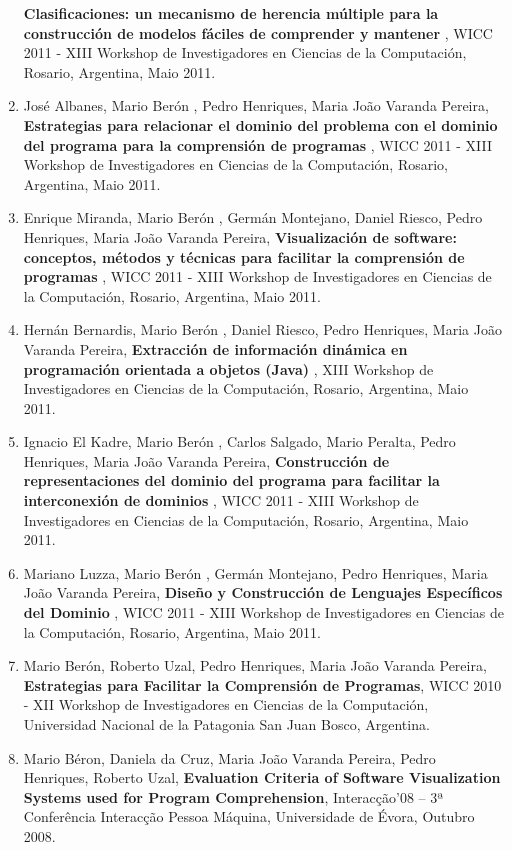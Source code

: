 \documentclass[11pt]{article}
\begin{document}
\begin{enumerate}
{{\bf{ Clasificaciones: un mecanismo de herencia múltiple para la construcción de modelos fáciles de comprender y mantener}} , WICC 2011 - XIII Workshop de Investigadores en Ciencias de la Computación, Rosario, Argentina, Maio 2011. }
\item{José Albanes,  Mario Berón , Pedro Henriques, Maria João Varanda Pereira, {
\bf{ Estrategias para relacionar el dominio del problema con el dominio del programa para la comprensión de programas}} , WICC 2011 - XIII Workshop de Investigadores en Ciencias de la Computación, Rosario, Argentina, Maio 2011. }
\item{Enrique Miranda, Mario Berón , Germán Montejano, Daniel Riesco, Pedro Henriques, Maria João Varanda Pereira, {
\bf{ Visualización de software: conceptos, métodos y técnicas para facilitar la comprensión de programas}} , WICC 2011 - XIII Workshop de Investigadores en Ciencias de la Computación, Rosario, Argentina, Maio 2011.}
\item{Hernán Bernardis,  Mario Berón , Daniel Riesco, Pedro Henriques, Maria João Varanda Pereira, {
\bf{ Extracción de información dinámica en programación orientada a objetos (Java)}} , XIII Workshop de Investigadores en Ciencias de la Computación, Rosario, Argentina, Maio 2011. }
\item{Ignacio El Kadre,  Mario Berón , Carlos Salgado, Mario Peralta, Pedro Henriques, Maria João Varanda Pereira, {
\bf{ Construcción de representaciones del dominio del programa para facilitar la interconexión de dominios}} , WICC 2011 - XIII Workshop de Investigadores en Ciencias de la Computación, Rosario, Argentina, Maio 2011.}
\item{Mariano Luzza,  Mario Berón , Germán Montejano, Pedro Henriques, Maria João Varanda Pereira, {
\bf{ Diseño y Construcción de Lenguajes Específicos del Dominio}} , WICC 2011 - XIII Workshop de Investigadores en Ciencias de la Computación, Rosario, Argentina, Maio 2011. }
\item{Mario Berón, Roberto Uzal, Pedro Henriques, Maria João Varanda Pereira, {
\bf{ Estrategias para Facilitar la Comprensión de Programas}}, WICC 2010 - XII Workshop de Investigadores en Ciencias de la Computación, Universidad Nacional de la Patagonia San Juan Bosco, Argentina. }
\item{Mario Béron, Daniela da Cruz, Maria João Varanda Pereira, Pedro Henriques, Roberto Uzal, {
\bf{ Evaluation Criteria of Software Visualization Systems used for Program Comprehension}}, Interacção'08 -- 3ª Conferência Interacção Pessoa
\-Máquina, Universidade de Évora, Outubro 2008.}

\end{enumerate}
\end{document}
